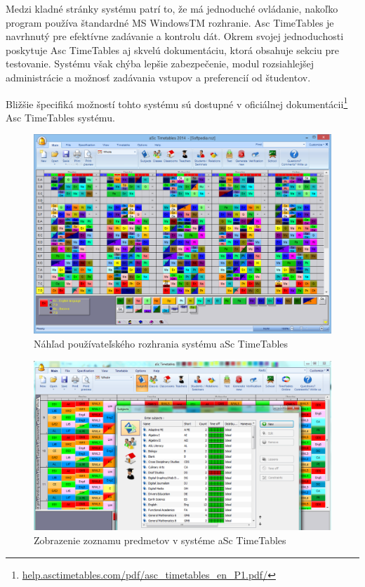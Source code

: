 Medzi kladné stránky systému patrí to, že má jednoduché ovládanie, nakoľko program používa štandardné MS WindowsTM
rozhranie. Asc TimeTables je navrhnutý pre efektívne zadávanie a kontrolu dát. Okrem svojej jednoduchosti poskytuje
Asc TimeTables aj skvelú dokumentáciu, ktorá obsahuje sekciu pre testovanie. Systému však chýba lepšie zabezpečenie,
modul rozsiahlejšej administrácie a možnosť zadávania vstupov a preferencií od študentov.

Bližšie špecifiká možností tohto systému sú dostupné v oficiálnej dokumentácii\footnote{\url{help.asctimetables.com/pdf/asc_timetables_en_P1.pdf/}}
Asc TimeTables systému.

\newpage
\begin{figure}[ht]
  \centering
  \includegraphics[width=0.71\columnwidth]{img/asc.png}
  \caption{\label{fig:asc_gui} Náhľad používateľského rozhrania systému aSc TimeTables \cite{asc}}
\end{figure}

\begin{figure}[ht]
  \centering
  \includegraphics[width=0.71\columnwidth]{img/asc2.png}
  \caption{\label{fig:asc2_gui} Zobrazenie zoznamu predmetov v systéme aSc TimeTables \cite{asc}}
\end{figure}

